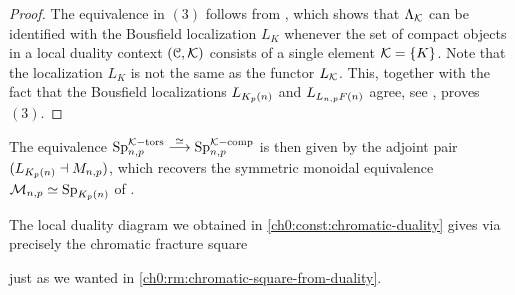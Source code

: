 \begin{proof}
    

    The equivalence in $(3)$ follows from \cite[2.34]{barthel-heard-valenzuela_2018}, which shows that $\Lambda_{\mathcal{K}}$ can be identified with the Bousfield localization $L_K$ whenever the set of compact objects in a local duality context $(\EuScript{C}, \mathcal{K})$ consists of a single element $\mathcal{K}=\{K\}$. Note that the localization $L_K$ is not the same as the functor $L_{\mathcal{K}}$. This, together with the fact that the Bousfield localizations $L_{K_p(n)}$ and $L_{L_{n,p} F(n)}$ agree, see \cite[7.1]{hovey-strickland_99}, proves $(3)$. 
\end{proof}

\begin{remark}
    The equivalence $\mathrm{Sp}_{n,p}^{\mathcal{K}-\mathrm{tors}}\overset{\simeq}\longrightarrow \mathrm{Sp}_{n,p}^{\mathcal{K}-\mathrm{comp}}$ is then given by the adjoint pair $(L_{K_p(n)}\dashv M_{n,p})$, which recovers the symmetric monoidal equivalence $\mathcal{M}_{n,p} \simeq \mathrm{Sp}_{{K_p(n)}}$ of \cite[6.19]{hovey-strickland_99}. 
\end{remark}

\begin{remark}
    The local duality diagram we obtained in \cref{ch0:const:chromatic-duality} gives via \cite[2.26]{barthel-heard-valenzuela_2018} precisely the chromatic fracture square
    \begin{center}
    \end{center}
    just as we wanted in \cref{ch0:rm:chromatic-square-from-duality}.   
\end{remark}

